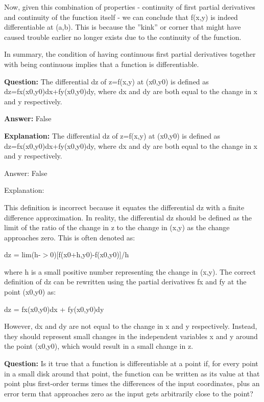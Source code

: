 \documentclass{article}
\begin{document}
Now, given this combination of properties - continuity of first partial derivatives and continuity of the function itself - we can conclude that f(x,y) is indeed differentiable at (a,b). This is because the ''kink'' or corner that might have caused trouble earlier no longer exists due to the continuity of the function.

In summary, the condition of having continuous first partial derivatives together with being continuous implies that a function is differentiable.
                
                \vspace{0.5cm} 
        
            
                \textbf {Question:} The differential dz of z=f(x,y) at (x0,y0) is defined as dz=fx(x0,y0)dx+fy(x0,y0)dy, where dx and dy are both equal to the change in x and y respectively.
                
                \textbf{Answer:} False

                \textbf{Explanation:} The differential dz of z=f(x,y) at (x0,y0) is defined as dz=fx(x0,y0)dx+fy(x0,y0)dy, where dx and dy are both equal to the change in x and y respectively.

Answer: False

Explanation:

This definition is incorrect because it equates the differential dz with a finite difference approximation. In reality, the differential dz should be defined as the limit of the ratio of the change in z to the change in (x,y) as the change approaches zero. This is often denoted as:

dz = lim(h-\ensuremath{>}0)[f(x0+h,y0)-f(x0,y0)]/h

where h is a small positive number representing the change in (x,y). The correct definition of dz can be rewritten using the partial derivatives fx and fy at the point (x0,y0) as:

dz = fx(x0,y0)dx + fy(x0,y0)dy

However, dx and dy are not equal to the change in x and y respectively. Instead, they should represent small changes in the independent variables x and y around the point (x0,y0), which would result in a small change in z.
                
                \vspace{0.5cm} 
        
            
                \textbf {Question:} Is it true that a function is differentiable at a point if, for every point in a small disk around that point, the function can be written as its value at that point plus first-order terms times the differences of the input coordinates, plus an error term that approaches zero as the input gets arbitrarily close to the point?
                
\end{document}
